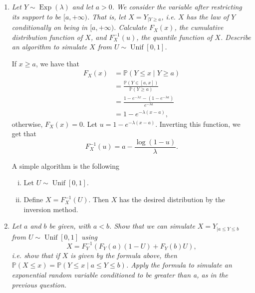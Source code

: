 \documentclass[a4paper,12pt]{article}
\newcommand{\unif}{\operatorname{Unif}}
\newcommand{\pr}{\mathbb{P}}
\theoremstyle{definition}
\begin{document}
\begin{enumerate}
    \item {\it Let $Y \sim \operatorname{Exp}(\lambda)$ and let $a > 0$. We consider the variable after restricting its support to be $[a, +\infty)$.
    That is, let $X = Y_{|Y \ge a}$, i.e. $X$ has the law of $Y$ conditionally on being in $[a, +\infty)$. Calculate
    $F_X(x)$, the cumulative distribution function of $X$, and
    $F^{-1}_X(u)$, the quantile function of $X$. Describe an algorithm to
    simulate $X$ from $U \sim \unif[0,1]$.}

    If $x \ge a$, we have that
    \begin{equation*}
        \begin{split}
            F_X(x) &= \pr(Y \le x \mid Y \ge a) \\
            &= \frac{\pr(Y \in [a, x])}{\pr(Y \ge a)} \\
            &= \frac{1 - e^{-\lambda x} - (1 - e^{-\lambda a})}{e^{-\lambda a}} \\
            &= 1 - e^{-\lambda(x - a)},
        \end{split}
    \end{equation*}
    otherwise, $F_X(x) = 0$. Let $u = 1 - e^{-\lambda(x - a)}$. Inverting this
    function, we get that 
    $$
    F_X^{-1}(u) = a-\frac{\log(1 - u)}{\lambda}.
    $$

    A simple algorithm is the following 
    \begin{enumerate}[(i)]
        \item Let $U \sim \unif[0,1]$. 
        \item Define $X = F_X^{-1}(U)$. Then $X$ has the desired distribution
        by the inversion method. 
    \end{enumerate}
    
    \item {\it Let $a$ and $b$ be given, with $a < b$. Show that we can simulate $X = Y_
    {|a \le Y \le b}$ from $U \sim \unif[0,1]$ using
    $$
    X= F_Y^{-1}(F_Y(a)(1 - U) + F_Y(b)U),
    $$
    i.e. show that if $X$ is given by the formula above, then $\pr(X \le
    x) = \pr(Y \le x\mid a \le Y \le b)$. Apply
    the formula to simulate an exponential random variable conditioned to
    be greater than a, as in the previous question.}


\end{enumerate}
\end{document}
